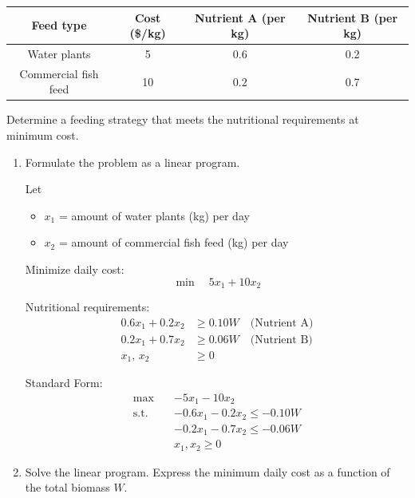 \documentclass[12pt,a4paper]{article}
\theoremstyle{definition}
\begin{document}
\begin{enumerate}
    
    \begin{center}
    \begin{tabular}{|c|c|c|c|}
    \hline
    Feed type & Cost (\$/kg) & Nutrient A (per kg) & Nutrient B (per kg) \\
    \hline
    Water plants & 5 & 0.6 & 0.2 \\
    Commercial fish feed & 10 & 0.2 & 0.7 \\
    \hline
    \end{tabular}
    \end{center}
    \vspace{-0.1cm}
    Determine a feeding strategy that meets the nutritional requirements at minimum cost.
    
    \begin{enumerate}
        \item Formulate the problem as a linear program.
        
        Let
        \begin{itemize}
            \item $x_1$ = amount of water plants (kg) per day
            \item $x_2$ = amount of commercial fish feed (kg) per day
        \end{itemize}
        
        Minimize daily cost:
        \[
        \min \quad 5x_1 + 10x_2
        \]
        
        Nutritional requirements:
        \begin{align*}
            0.6x_1 + 0.2x_2 &\ge 0.10W \quad \text{(Nutrient A)} \\
            0.2x_1 + 0.7x_2 &\ge 0.06W \quad \text{(Nutrient B)} \\
            x_1,\, x_2 &\ge 0
        \end{align*}
        
        Standard Form: 
        \[
        \begin{aligned}
        \max \quad & -5x_1 - 10x_2 \\
        \text{s.t.} \quad & -0.6x_1 - 0.2x_2 \le -0.10W \\
        & -0.2x_1 - 0.7x_2 \le -0.06W \\
        & x_1, x_2 \ge 0
        \end{aligned}
        \]

        \item Solve the linear program. Express the minimum daily cost as a function of the total biomass $W$.



\end{enumerate}
\end{enumerate}
\end{document}
